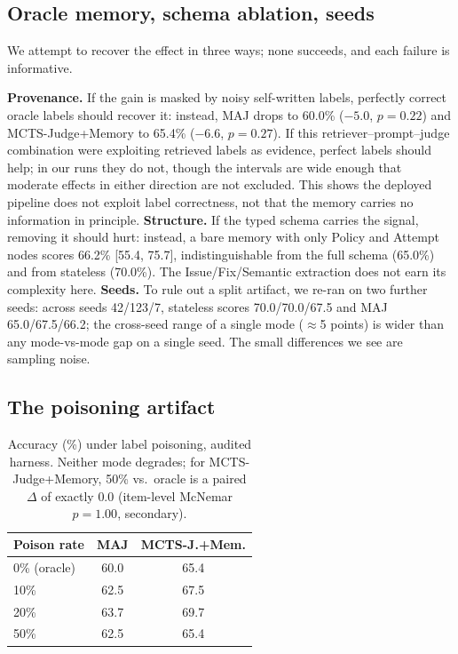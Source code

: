 \documentclass[]{ceurart}
\begin{document}
\subsection{Oracle memory, schema ablation, seeds}

We attempt to recover the effect in three ways; none succeeds, and each failure is informative.

\textbf{Provenance.} If the gain is masked by noisy self-written labels, perfectly correct oracle labels should recover it: instead, MAJ drops to 60.0\% ($-5.0$, $p{=}0.22$) and MCTS-Judge+Memory to 65.4\% ($-6.6$, $p{=}0.27$). If this retriever--prompt--judge combination were exploiting retrieved labels as evidence, perfect labels should help; in our runs they do not, though the intervals are wide enough that moderate effects in either direction are not excluded. This shows the deployed pipeline does not exploit label correctness, not that the memory carries no information in principle. \textbf{Structure.} If the typed schema carries the signal, removing it should hurt: instead, a bare memory with only Policy and Attempt nodes scores 66.2\% [55.4, 75.7], indistinguishable from the full schema (65.0\%) and from stateless (70.0\%). The Issue/Fix/Semantic extraction does not earn its complexity here. \textbf{Seeds.} To rule out a split artifact, we re-ran on two further seeds: across seeds 42/123/7, stateless scores 70.0/70.0/67.5 and MAJ 65.0/67.5/66.2; the cross-seed range of a single mode ($\approx$5 points) is wider than any mode-vs-mode gap on a single seed. The small differences we see are sampling noise.


\subsection{The poisoning artifact}
\label{sec:poisoning}

\begin{table}[t]
\centering
\small
\caption{Accuracy (\%) under label poisoning, audited harness. Neither mode degrades; for MCTS-Judge+Memory, 50\% vs.\ oracle is a paired $\Delta$ of exactly $0.0$ (item-level McNemar $p{=}1.00$, secondary).}
\label{tab:poison}
\begin{tabular}{lcc}
\toprule
Poison rate & MAJ & MCTS-J.+Mem. \\
\midrule
0\% (oracle) & 60.0 & 65.4 \\
10\% & 62.5 & 67.5 \\
20\% & 63.7 & 69.7 \\
50\% & 62.5 & 65.4 \\
\bottomrule
\end{tabular}

\end{table}
\end{document}
